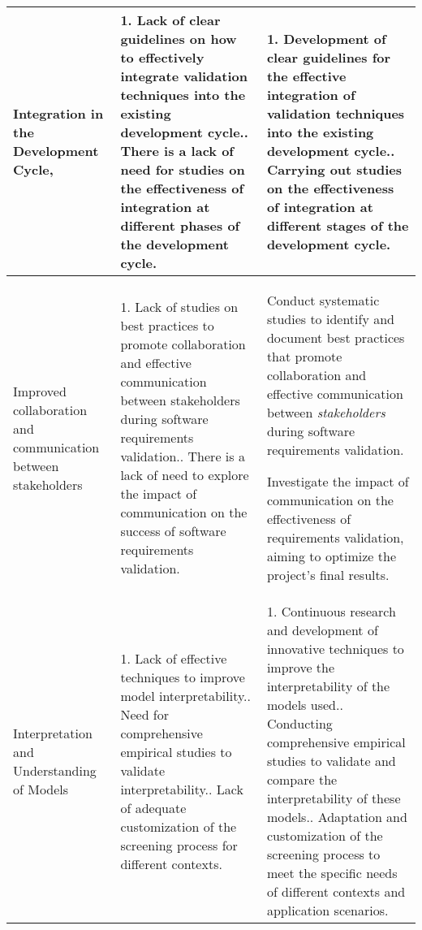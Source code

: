 \begin{longtable}[htbp]{|p{2.70cm}|p{4.5cm}|p{4.5cm}|}
\hline
 Integration in the Development Cycle,\cite{kumar2021,nanduri1995} &
1. Lack of clear guidelines on how to effectively integrate validation techniques into the existing development cycle.\newline
2. There is a lack of need for studies on the effectiveness of integration at different phases of the development cycle.
\newline
 &
1. Development of clear guidelines for the effective integration of validation techniques into the existing development cycle.\newline
2. Carrying out studies on the effectiveness of integration at different stages of the development cycle. \\
\hline

Improved collaboration and communication between stakeholders \cite{kumar2021}
&
1. Lack of studies on best practices to promote collaboration and effective communication between stakeholders during software requirements validation.\newline
2. There is a lack of need to explore the impact of communication on the success of software requirements validation.
&
Conduct systematic studies to identify and document best practices that promote collaboration and effective communication between \textit{stakeholders} during software requirements validation.

Investigate the impact of communication on the effectiveness of requirements validation, aiming to optimize the project's final results.\\

\hline
\raggedright
Interpretation and Understanding of Models
\cite{Atoum2021, nanduri1995, Alamelu2021}
&
\raggedright
1. Lack of effective techniques to improve model interpretability.\newline
2. Need for comprehensive empirical studies to validate interpretability.\newline
3. Lack of adequate customization of the screening process for different contexts.

 &
\raggedright
1. Continuous research and development of innovative techniques to improve the interpretability of the models used.\newline
2. Conducting comprehensive empirical studies to validate and compare the interpretability of these models.\newline
3. Adaptation and customization of the screening process to meet the specific needs of different contexts and application scenarios.

\end{longtable}

